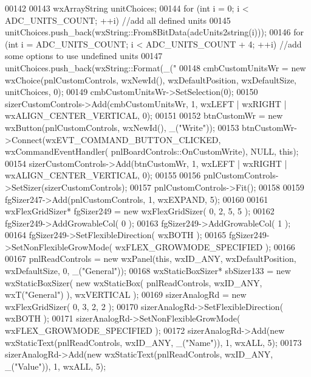 \begin{DoxyCode}
00142 
00143     wxArrayString unitChoices;
00144     \textcolor{keywordflow}{for} (\textcolor{keywordtype}{int} i = 0; i < ADC_UNITS_COUNT; ++i) \textcolor{comment}{//add all defined units}
00145         unitChoices.push\_back(wxString::From8BitData(adcUnits2string(i)));
00146     \textcolor{keywordflow}{for} (\textcolor{keywordtype}{int} i = ADC\_UNITS\_COUNT; i < ADC\_UNITS\_COUNT + 4; ++i) \textcolor{comment}{//add some options to use undefined units}
00147         unitChoices.push\_back(wxString::Format(\_(\textcolor{stringliteral}{"%
00148     cmbCustomUnitsWr = \textcolor{keyword}{new} wxChoice(pnlCustomControls, wxNewId(), wxDefaultPosition, wxDefaultSize, 
      unitChoices, 0);
00149     cmbCustomUnitsWr->SetSelection(0);
00150     sizerCustomControls->Add(cmbCustomUnitsWr, 1, wxLEFT | wxRIGHT | wxALIGN\_CENTER\_VERTICAL, 0);
00151 
00152     btnCustomWr = \textcolor{keyword}{new} wxButton(pnlCustomControls, wxNewId(), \_(\textcolor{stringliteral}{"Write"}));
00153     btnCustomWr->Connect(wxEVT\_COMMAND\_BUTTON\_CLICKED, wxCommandEventHandler(
      pnlBoardControls::OnCustomWrite), NULL, \textcolor{keyword}{this});
00154     sizerCustomControls->Add(btnCustomWr, 1, wxLEFT | wxRIGHT | wxALIGN\_CENTER\_VERTICAL, 0);
00155 
00156     pnlCustomControls->SetSizer(sizerCustomControls);
00157     pnlCustomControls->Fit();
00158 
00159     fgSizer247->Add(pnlCustomControls, 1, wxEXPAND, 5);
00160 
00161     wxFlexGridSizer* fgSizer249 = \textcolor{keyword}{new} wxFlexGridSizer( 0, 2, 5, 5 );
00162     fgSizer249->AddGrowableCol( 0 );
00163     fgSizer249->AddGrowableCol( 1 );
00164     fgSizer249->SetFlexibleDirection( wxBOTH );
00165     fgSizer249->SetNonFlexibleGrowMode( wxFLEX\_GROWMODE\_SPECIFIED );
00166 
00167     pnlReadControls = \textcolor{keyword}{new} wxPanel(\textcolor{keyword}{this}, wxID\_ANY, wxDefaultPosition, wxDefaultSize, 0, \_(\textcolor{stringliteral}{"General"}));
00168     wxStaticBoxSizer* sbSizer133 = \textcolor{keyword}{new} wxStaticBoxSizer( \textcolor{keyword}{new} wxStaticBox( 
      pnlReadControls, wxID\_ANY, wxT(\textcolor{stringliteral}{"General"}) ), wxVERTICAL );
00169     sizerAnalogRd = \textcolor{keyword}{new} wxFlexGridSizer( 0, 3, 2, 2 );
00170     sizerAnalogRd->SetFlexibleDirection( wxBOTH );
00171     sizerAnalogRd->SetNonFlexibleGrowMode( wxFLEX\_GROWMODE\_SPECIFIED );
00172     sizerAnalogRd->Add(\textcolor{keyword}{new} wxStaticText(pnlReadControls, wxID\_ANY, \_(\textcolor{stringliteral}{"Name"})), 1, wxALL, 5);
00173     sizerAnalogRd->Add(\textcolor{keyword}{new} wxStaticText(pnlReadControls, wxID\_ANY, \_(\textcolor{stringliteral}{"Value"})), 1, wxALL, 5);
}
\end{DoxyCode}
